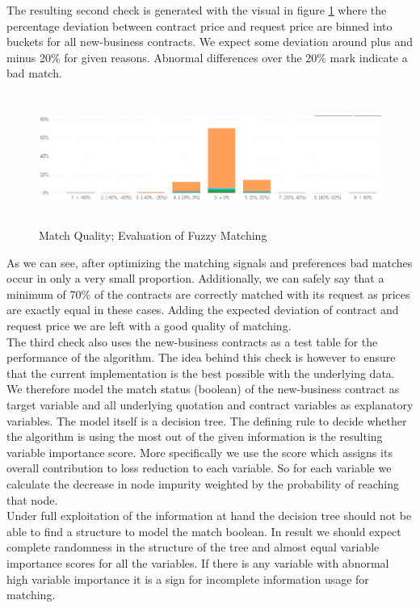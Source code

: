 \documentclass[12pt,titlepage]{article}
\begin{document}
The resulting second check is generated with the visual in figure \ref{fig:matchquality} where the percentage deviation between contract price and request price are binned into buckets for all new-business contracts. We expect some deviation around plus and minus 20\% for given reasons. Abnormal differences over the 20\% mark indicate a bad match. \\
\begin{figure}[H]
    \centerline{\includegraphics[height=4.3cm]{quality.png}}
\caption{Match Quality; Evaluation of Fuzzy Matching}
\label{fig:matchquality}
\end{figure}
\noindent
As we can see, after optimizing the matching signals and preferences bad matches occur in only a very small proportion. Additionally, we can safely say that a minimum of 70\% of the contracts are correctly matched with its request as prices are exactly equal in these cases. Adding the expected deviation of contract and request price we are left with a good quality of matching.\\
The third check also uses the new-business contracts as a test table for the performance of the algorithm. The idea behind this check is however to ensure that the current implementation is the best possible with the underlying data. \\
We therefore model the match status (boolean) of the new-business contract as target variable and all underlying quotation and contract variables as explanatory variables. The model itself is a decision tree. The defining rule to decide whether the algorithm is using the most out of the given information is the resulting variable importance score. More specifically we use the score which assigns its overall contribution to loss reduction to each variable. So for each variable we calculate the decrease in node impurity weighted by the probability of reaching that node.\\
Under full exploitation of the information at hand the decision tree should not be able to find a structure to model the match boolean. In result we should expect complete randomness in the structure of the tree and almost equal variable importance scores for all the variables. If there is any variable with abnormal high variable importance it is a sign for incomplete information usage for matching. \\
\end{document}
